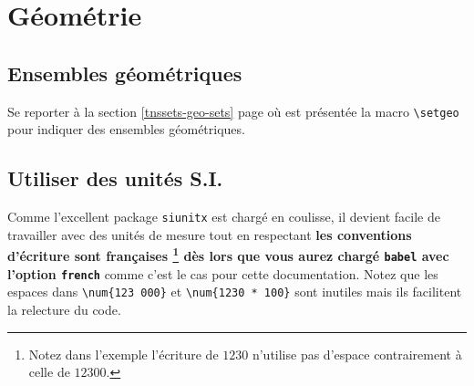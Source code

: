 \documentclass[12pt,a4paper]{book}
\newcommand\env[1]{\texttt{#1}}
\newcommand\macro[1]{\env{\textbackslash{}#1}}
\theoremstyle{definition}
\begin{document}
{{\begin{center}
\end{center}
\chapter{Géométrie}

\section{Ensembles géométriques}

Se reporter à la section \ref{tnssets-geo-sets} page \pageref{tnssets-geo-sets} où est présentée la macro \macro{setgeo} pour indiquer des ensembles géométriques.
\section{Utiliser des unités S.I.}

Comme l'excellent package \verb#siunitx# est chargé en coulisse, il devient facile de travailler avec des unités de mesure tout en respectant
\textbf{%
les conventions d'écriture sont françaises
	\footnote{
		Notez dans l'exemple l'écriture de $\num{1230}$ n'utilise pas d'espace contrairement à celle de $\num{12300}$.
	}
dès lors que vous aurez chargé \texttt{babel} avec l'option \texttt{french}%
} comme c'est le cas pour cette documentation.
Notez que les espaces dans \verb#\num{123 000}# et \verb#\num{1230 * 100}# sont inutiles mais ils facilitent la relecture du code.

}}
\end{document}
